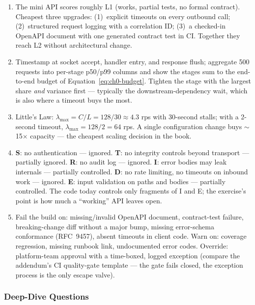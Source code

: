 \begin{enumerate}[label=\textbf{E0.\arabic*.}, leftmargin=3.2em]
  \item The mini API scores roughly L1 (works, partial tests, no formal
    contract). Cheapest three upgrades: (1)~explicit timeouts on every
    outbound call; (2)~structured request logging with a correlation ID;
    (3)~a checked-in OpenAPI document with one generated contract test in
    CI. Together they reach L2 without architectural change.
  \item Timestamp at socket accept, handler entry, and response flush;
    aggregate 500 requests into per-stage p50/p99 columns and show the
    stages sum to the end-to-end budget of
    Equation~\eqref{eq:ch0-budget}. Tighten the stage with the largest
    share \emph{and} variance first --- typically the downstream-dependency
    wait, which is also where a timeout buys the most.
  \item Little's Law: $\lambda_{\max} = C/L = 128/30 \approx 4.3$ rps with
    30-second stalls; with a 2-second timeout, $\lambda_{\max} = 128/2 = 64$
    rps. A single configuration change buys $\sim$15$\times$ capacity ---
    the cheapest scaling decision in the book.
  \item \textbf{S}: no authentication --- ignored. \textbf{T}: no integrity
    controls beyond transport --- partially ignored. \textbf{R}: no audit
    log --- ignored. \textbf{I}: error bodies may leak internals ---
    partially controlled. \textbf{D}: no rate limiting, no timeouts on
    inbound work --- ignored. \textbf{E}: input validation on paths and
    bodies --- partially controlled. The code today controls only fragments
    of I and E; the exercise's point is how much a ``working'' API leaves
    open.
  \item Fail the build on: missing/invalid OpenAPI document, contract-test
    failure, breaking-change diff without a major bump, missing error-schema
    conformance (RFC~9457), absent timeouts in client code. Warn on:
    coverage regression, missing runbook link, undocumented error codes.
    Override: platform-team approval with a time-boxed, logged exception
    (compare the addendum's CI quality-gate template --- the gate fails
    closed, the exception process is the only escape valve).
\end{enumerate}

\subsubsection*{Deep-Dive Questions}


